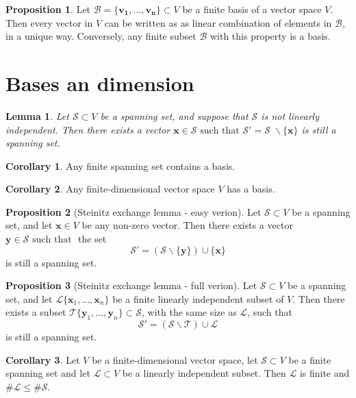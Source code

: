 \documentclass[11pt,a4paper]{article}
\newcommand\Sf{\mathcal{S}}
\newcommand\st{\text{ such that }}
\newtheorem{lemma}{Lemma}
\theoremstyle{definition}
\newtheorem{proposition}{Proposition}
\newtheorem{corollary}{Corollary}
\begin{document}
\begin{proposition}
    Let $ \mathcal{B} = \{ \mathbf{v_1}, ..., \mathbf{v_n} \} \subset V $ be a finite basis of a vector space $ V $. Then every vector in $ V $ can be written as as linear combination of elements in $ \mathcal{B} $, in a unique way.
    Conversely, any finite subset $ \mathcal{B} $ with this property is a basis.
\end{proposition}

\section{Bases an dimension}

\begin{lemma}
    Let $ \mathcal{S} \subset V $ be a spanning set, and suppose that $\mathcal{S}$ is not linearly independent.
    Then there exists a vector $ \mathbf{x} \in \Sf \st \Sf' = \Sf  \; \backslash \{ \mathbf{x} \} $ is still a spanning set.
\end{lemma}

\begin{corollary}
    Any finite spanning set contains a basis. 
\end{corollary}

\begin{corollary}
    Any finite-dimensional vector space $ V $ has a basis.
\end{corollary}

\begin{proposition}[Steinitz exchange lemma - easy verion]
    Let $ \Sf \subset V $ be a spanning set, and let $ \mathbf{x} \in V $ be any non-zero vector. Then there exists a vector $ \mathbf{y} \in \Sf \st $ the set
    \[ \Sf' = (\Sf \backslash \{ \mathbf{y} \}) \cup \{ \mathbf{x} \} \]
    is still a spanning set.
\end{proposition}

\begin{proposition}[Steinitz exchange lemma - full verion]
    Let $ \Sf \subset V $ be a spanning set, and let $ \mathcal{L} \{ \mathbf{x}_1, ..., \mathbf{x}_n \}$ be a finite linearly independent subset of $ V $. 
    Then there exists a subset $ \mathcal{T} \{ \mathbf{y}_1, ..., \mathbf{y}_n \}\subset \Sf $, with the same size as $ \mathcal{L} $, such that  
    \[ \Sf' = (\Sf \backslash \mathcal{T}) \cup \mathcal{L} \]
    is still a spanning set.
\end{proposition}

\begin{corollary}
    Let $ V $ be a finite-dimensional vector space, let $ \Sf \subset V $ be a finite spanning set and let $ \mathcal{L} \subset V $ be a linearly independent subset. 
    Then $ \mathcal{L} $ is finite and $\# \mathcal{L} \leq \# \Sf $.
\end{corollary}
\end{document}
